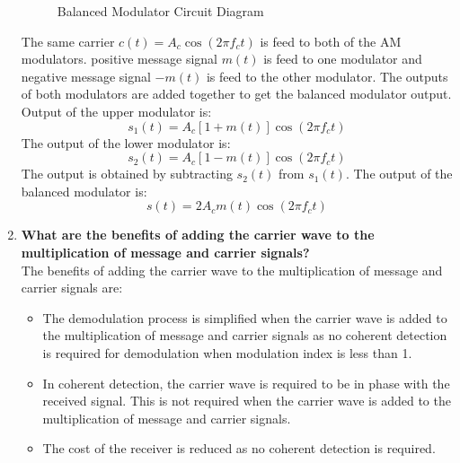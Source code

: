 \begin{enumerate}
\begin{figure}[H]
            \caption{Balanced Modulator Circuit Diagram}
            \label{fig:balanced_modulator}
        \end{figure}
        The same carrier $c(t) = A_c \cos(2\pi f_c t)$ is feed to both of the AM modulators. positive message signal $m(t)$ is feed to one modulator and negative message signal $-m(t)$ is feed to the other modulator. The outputs of both modulators are added together to get the balanced modulator output.
        Output of the upper modulator is:
        \begin{equation}
            s_1(t) = A_c [1+m(t)]\cos(2\pi f_c t)
        \end{equation}
        The output of the lower modulator is:
        \begin{equation}
            s_2(t) = A_c [1-m(t)]\cos(2\pi f_c t)
        \end{equation}
        The output is obtained by subtracting  $s_2(t)$ from $s_1(t)$. The output of the balanced modulator is:
        \begin{equation}
            s(t) = 2 A_c m(t)\cos(2\pi f_c t)
        \end{equation}
    
        \item \textbf{What are the benefits of adding the carrier wave to the multiplication of message and
        carrier signals?}\\
        The benefits of adding the carrier wave to the multiplication of message and carrier signals are:
        \begin{itemize}
            \item The demodulation process is simplified when the carrier wave is added to the multiplication of message and carrier signals as no coherent detection is required for demodulation when modulation index is less than 1.
            \item In coherent detection, the carrier wave is required to be in phase with the received signal. This is not required when the carrier wave is added to the multiplication of message and carrier signals.
            \item The cost of the receiver is reduced as no coherent detection is required.
        \end{itemize}
\end{enumerate}